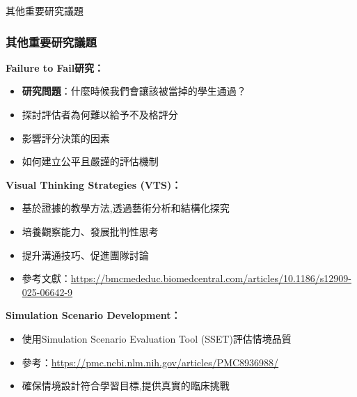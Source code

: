 \documentclass[aspectratio=169]{beamer}
\begin{document}
\begin{frame}{其他重要研究議題}
\frametitle{其他重要研究議題}

\textbf{Failure to Fail研究：}
\begin{itemize}
    \item \textbf{研究問題}：什麼時候我們會讓該被當掉的學生通過？
    \item 探討評估者為何難以給予不及格評分
    \item 影響評分決策的因素
    \item 如何建立公平且嚴謹的評估機制
\end{itemize}

\vspace{0.5cm}

\textbf{Visual Thinking Strategies (VTS)：}
\begin{itemize}
    \item 基於證據的教學方法,透過藝術分析和結構化探究
    \item 培養觀察能力、發展批判性思考
    \item 提升溝通技巧、促進團隊討論
    \item 參考文獻：\url{https://bmcmededuc.biomedcentral.com/articles/10.1186/s12909-025-06642-9}
\end{itemize}

\vspace{0.5cm}

\textbf{Simulation Scenario Development：}
\begin{itemize}
    \item 使用Simulation Scenario Evaluation Tool (SSET)評估情境品質
    \item 參考：\url{https://pmc.ncbi.nlm.nih.gov/articles/PMC8936988/}
    \item 確保情境設計符合學習目標,提供真實的臨床挑戰
\end{itemize}
\end{frame}
\end{document}
